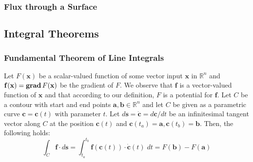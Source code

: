 \subsubsection{Flux through a Surface}

\subsection{Integral Theorems}

\subsubsection{Fundamental Theorem of Line Integrals}
Let $F(\mathbf{x})$ be a scalar-valued function of some vector input $\mathbf{x}$ in $\mathbb{R}^n$ and $\mathbf{f(x)} = \operatorname{\mathbf{grad}} F(\mathbf{x})$ be the gradient of $F$. We observe that $\mathbf{f}$ is a vector-valued function of $\mathbf{x}$ and that according to our definition, $F$ is a potential for $\mathbf{f}$. Let $C$ be a contour with start and end points $\mathbf{a,b} \in \mathbb{R}^n$ and let $C$ be given as a parametric curve $\mathbf{c} = \mathbf{c}(t)$ with parameter $t$. Let $d\mathbf{s} = \dot{\mathbf{c}} = d\mathbf{c} / dt$ be an infinitesimal tangent vector along $C$ at the position $\mathbf{c}(t)$ and $\mathbf{c}(t_a) = \mathbf{a}, \mathbf{c}(t_b) = \mathbf{b}$. Then, the following holds:
\begin{equation}
 \int_C \mathbf{f} \cdot d\mathbf{s}  =
 \int_{t_a}^{t_b}  \mathbf{f} (\mathbf{c}(t) ) \cdot \dot{\mathbf{c}}(t) \; dt =
 F(\mathbf{b}) - F(\mathbf{a}) 
\end{equation}
